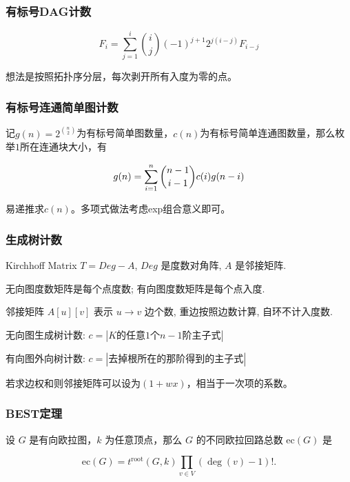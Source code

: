 \subsubsection{有标号DAG计数}

$$
F_i=\sum_{j=1}^i \binom{i}{j}(-1)^{j+1}2^{j(i-j)}F_{i-j}
$$

想法是按照拓扑序分层，每次剥开所有入度为零的点。

\subsubsection{有标号连通简单图计数}

记$g(n)=2^{\binom n2}$为有标号简单图数量，$c(n)$为有标号简单连通图数量，那么枚举$1$所在连通块大小，有

$$
g(n) = \sum_{i=1}^n \dbinom{n-1}{i-1}c(i)g(n-i)
$$

易递推求$c(n)$。多项式做法考虑exp组合意义即可。

\subsubsection{生成树计数}
Kirchhoff Matrix $T = Deg - A$, $Deg$ 是度数对角阵, $A$ 是邻接矩阵. 

无向图度数矩阵是每个点度数; 有向图度数矩阵是每个点入度.

邻接矩阵 $A[u][v]$ 表示 $u \to v$ 边个数, 重边按照边数计算, 自环不计入度数.

无向图生成树计数: $c = |K的任意1个 n-1 阶主子式|$

有向图外向树计数: $c = |去掉根所在的那阶得到的主子式|$

若求边权和则邻接矩阵可以设为$(1+wx)$，相当于一次项的系数。

\subsubsection{BEST定理}
设 $G$ 是有向欧拉图，$k$ 为任意顶点，那么 $G$ 的不同欧拉回路总数 $\mathrm{ec}(G)$ 是

$$
\mathrm{ec}(G) = t^\mathrm{root}(G,k)\prod_{v\in V}(\deg (v) - 1)!.
$$



